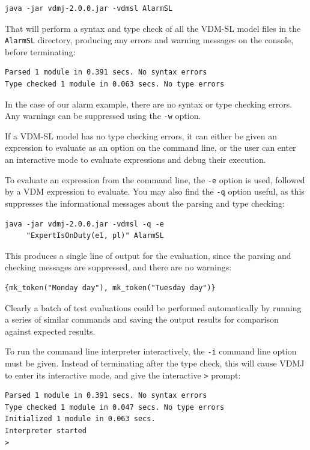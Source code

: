 {\begin{lstlisting}
java -jar vdmj-2.0.0.jar -vdmsl AlarmSL
\end{lstlisting}

\noindent That will perform a syntax and type check of all the
VDM-SL model files in the \texttt{AlarmSL} directory, producing any errors and
warning messages on the console, before terminating:

\begin{lstlisting}
Parsed 1 module in 0.391 secs. No syntax errors
Type checked 1 module in 0.063 secs. No type errors
\end{lstlisting}

\noindent In the case of our alarm example, there are no syntax or
type checking errors. Any warnings can be suppressed using the
\verb|-w| option.

If a VDM-SL model has no type checking errors, it can either be given
an expression to evaluate as an option on the command line, or the
user can enter an interactive mode to evaluate expressions and debug
their execution.

To evaluate an expression from the command line, the \verb|-e| option
is used, followed by a VDM expression to evaluate. You may also find
the \verb|-q| option useful, as this suppresses the informational
messages about the parsing and type checking:

\begin{lstlisting}
java -jar vdmj-2.0.0.jar -vdmsl -q -e 
     "ExpertIsOnDuty(e1, pl)" AlarmSL
\end{lstlisting}

\noindent This produces a single line of output for the evaluation,
since the parsing and checking messages are suppressed, and there are
no warnings:

\begin{lstlisting}
{mk_token("Monday day"), mk_token("Tuesday day")}
\end{lstlisting}

Clearly a batch of test evaluations could be performed automatically
by running a series of similar commands and saving the output results
for comparison against expected results.

To run the command line interpreter interactively, the \verb|-i|
command line option must be given. Instead of terminating after the
type check, this will cause VDMJ to enter its interactive mode, and
give the interactive \verb|>| prompt:

\begin{lstlisting}
Parsed 1 module in 0.391 secs. No syntax errors
Type checked 1 module in 0.047 secs. No type errors
Initialized 1 module in 0.063 secs. 
Interpreter started
>
\end{lstlisting}

}
